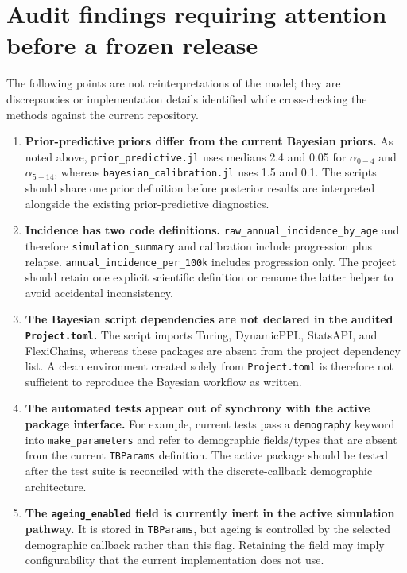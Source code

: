 \documentclass[11pt]{article}
\newcommand{\code}[1]{\texttt{#1}}
\begin{document}
\section{Audit findings requiring attention before a frozen release}
\label{sec:audit}

The following points are not reinterpretations of the model; they are discrepancies or implementation details identified while cross-checking the methods against the current repository.

\begin{enumerate}[leftmargin=*,label=\textbf{A\arabic*.}]
\item \textbf{Prior-predictive priors differ from the current Bayesian priors.} As noted above, \code{prior\_predictive.jl} uses medians 2.4 and 0.05 for $\alpha_{0-4}$ and $\alpha_{5-14}$, whereas \code{bayesian\_calibration.jl} uses 1.5 and 0.1. The scripts should share one prior definition before posterior results are interpreted alongside the existing prior-predictive diagnostics.

\item \textbf{Incidence has two code definitions.} \code{raw\_annual\_incidence\_by\_age} and therefore \code{simulation\_summary} and calibration include progression plus relapse. \code{annual\_incidence\_per\_100k} includes progression only. The project should retain one explicit scientific definition or rename the latter helper to avoid accidental inconsistency.

\item \textbf{The Bayesian script dependencies are not declared in the audited \code{Project.toml}.} The script imports Turing, DynamicPPL, StatsAPI, and FlexiChains, whereas these packages are absent from the project dependency list. A clean environment created solely from \code{Project.toml} is therefore not sufficient to reproduce the Bayesian workflow as written.

\item \textbf{The automated tests appear out of synchrony with the active package interface.} For example, current tests pass a \code{demography} keyword into \code{make\_parameters} and refer to demographic fields/types that are absent from the current \code{TBParams} definition. The active package should be tested after the test suite is reconciled with the discrete-callback demographic architecture.

\item \textbf{The \code{ageing\_enabled} field is currently inert in the active simulation pathway.} It is stored in \code{TBParams}, but ageing is controlled by the selected demographic callback rather than this flag. Retaining the field may imply configurability that the current implementation does not use.


\end{enumerate}
\end{document}
